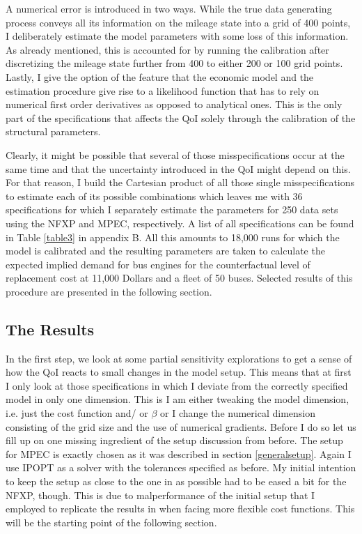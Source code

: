 A numerical error is introduced in two ways. While the true data generating process conveys all its information on the mileage state into a grid of 400 points, I deliberately estimate the model parameters with some loss of this information. As already mentioned, this is accounted for by running the calibration after discretizing the mileage state further from 400 to either 200 or 100 grid points. Lastly, I give the option of the feature that the economic model and the estimation procedure give rise to a likelihood function that has to rely on numerical first order derivatives as opposed to analytical ones. This is the only part of the specifications that affects the QoI solely through the calibration of the structural parameters.

Clearly, it might be possible that several of those misspecifications occur at the same time and that the uncertainty introduced in the QoI might depend on this. For that reason, I build the Cartesian product of all those single misspecifications to estimate each of its possible combinations which leaves me with 36 specifications for which I separately estimate the parameters for 250 data sets using the NFXP and MPEC, respectively. A list of all specifications can be found in Table \ref{table3} in appendix B. All this amounts to 18,000 runs for which the model is calibrated and the resulting parameters are taken to calculate the expected implied demand for bus engines for the counterfactual level of replacement cost at 11,000 Dollars and a fleet of 50 buses. Selected results of this procedure are presented in the following section.

\subsection{The Results}

In the first step, we look at some partial sensitivity explorations to get a sense of how the QoI reacts to small changes in the model setup. This means that at first I only look at those specifications in which I deviate from the correctly specified model in only one dimension. This is I am either tweaking the model dimension, i.e. just the cost function and/ or $\beta$ or I change the numerical dimension consisting of the grid size and the use of numerical gradients. Before I do so let us fill up on one missing ingredient of the setup discussion from before. The setup for MPEC is exactly chosen as it was described in section \ref{generalsetup}. Again I use IPOPT as a solver with the tolerances specified as before. My initial intention to keep the setup as close to the one in \cite{Iskhakov.2016} as possible had to be eased a bit for the NFXP, though. This is due to malperformance of the initial setup that I employed to replicate the results in \cite{Iskhakov.2016} when facing more flexible cost functions. This will be the starting point of the following section.

